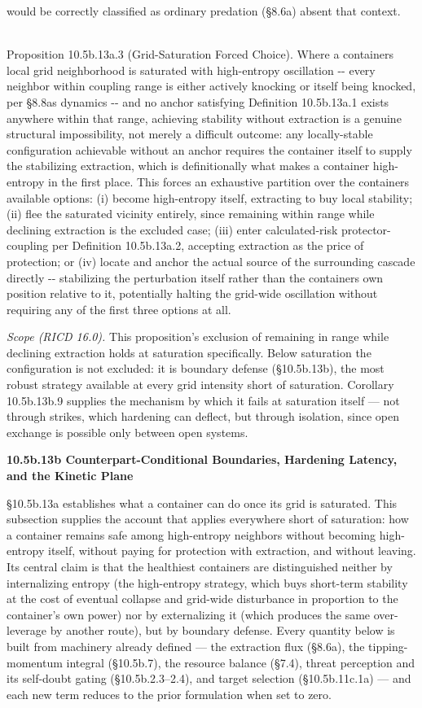\documentclass[
]{article}
\begin{document}
would be correctly classified as ordinary predation (§8.6a) absent that
context.\\
\strut \\
Proposition 10.5b.13a.3 (Grid-Saturation Forced Choice). Where a
container\textquotesingle s local grid neighborhood is saturated with
high-entropy oscillation -\/- every neighbor within coupling range is
either actively knocking or itself being knocked, per
§8.8a\textquotesingle s dynamics -\/- and no anchor satisfying
Definition 10.5b.13a.1 exists anywhere within that range, achieving
stability without extraction is a genuine structural impossibility, not
merely a difficult outcome: any locally-stable configuration achievable
without an anchor requires the container itself to supply the
stabilizing extraction, which is definitionally what makes a container
high-entropy in the first place. This forces an exhaustive partition
over the container\textquotesingle s available options: (i) become
high-entropy itself, extracting to buy local stability; (ii) flee the
saturated vicinity entirely, since remaining within range while
declining extraction is the excluded case; (iii) enter calculated-risk
protector-coupling per Definition 10.5b.13a.2, accepting extraction as
the price of protection; or (iv) locate and anchor the actual source of
the surrounding cascade directly -\/- stabilizing the perturbation
itself rather than the container\textquotesingle s own position relative
to it, potentially halting the grid-wide oscillation without requiring
any of the first three options at all.

\emph{Scope (RICD 16.0).} This proposition's exclusion of remaining in
range while declining extraction holds at saturation specifically. Below
saturation the configuration is not excluded: it is boundary defense
(§10.5b.13b), the most robust strategy available at every grid intensity
short of saturation. Corollary 10.5b.13b.9 supplies the mechanism by
which it fails at saturation itself --- not through strikes, which
hardening can deflect, but through isolation, since open exchange is
possible only between open systems.

\textbf{10.5b.13b Counterpart-Conditional Boundaries, Hardening Latency,
and the Kinetic Plane}

§10.5b.13a establishes what a container can do once its grid is
saturated. This subsection supplies the account that applies everywhere
short of saturation: how a container remains safe among high-entropy
neighbors without becoming high-entropy itself, without paying for
protection with extraction, and without leaving. Its central claim is
that the healthiest containers are distinguished neither by
internalizing entropy (the high-entropy strategy, which buys short-term
stability at the cost of eventual collapse and grid-wide disturbance in
proportion to the container's own power) nor by externalizing it
(which produces the same over-leverage by another route), but by
boundary defense. Every quantity below is built from machinery already
defined --- the extraction flux (§8.6a), the tipping-momentum integral
(§10.5b.7), the resource balance (§7.4), threat perception and its
self-doubt gating (§10.5b.2.3--2.4), and target selection
(§10.5b.11c.1a) --- and each new term reduces to the prior formulation
when set to zero.
\end{document}

